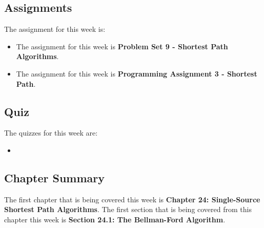 \subsection{Assignments}

The assignment for this week is:

\begin{itemize}
    \item The assignment for this week is \textbf{Problem Set 9 - Shortest Path Algorithms}. 
    \item The assignment for this week is \textbf{Programming Assignment 3 - Shortest Path}. 
\end{itemize}

\subsection{Quiz}

The quizzes for this week are:

\begin{itemize}
    \item {} \textbullet {} 
\end{itemize}

\subsection{Chapter Summary}

The first chapter that is being covered this week is \textbf{Chapter 24: Single-Source Shortest Path Algorithms}. The first section that is being covered from this chapter this week is \textbf{Section 24.1: The Bellman-Ford Algorithm}.

